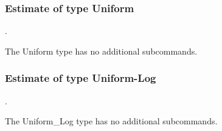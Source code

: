 \subsubsection{Estimate of type Uniform}
.
\label{syntax:Estimate-Uniform}

The Uniform type has no additional subcommands.
\subsubsection{Estimate of type Uniform-Log}
.
\label{syntax:Estimate-UniformLog}

The Uniform\_Log type has no additional subcommands.
